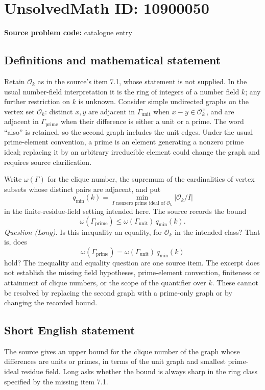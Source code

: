 \documentclass[11pt]{article}
\begin{document}
\section*{UnsolvedMath ID: 10900050}
\textbf{Source problem code:} catalogue entry
\subsection{Definitions and mathematical statement}
Retain \(\mathcal O_k\) as in the source's item 7.1, whose statement is not supplied. In the usual number-field interpretation it is the ring of integers of a number field \(k\); any further restriction on \(k\) is unknown. Consider simple undirected graphs on the vertex set \(\mathcal O_k\): distinct \(x,y\) are adjacent in \(\Gamma_{\mathrm{unit}}\) when \(x-y\in\mathcal O_k^\times\), and are adjacent in \(\Gamma_{\mathrm{prime}}\) when their difference is either a unit or a prime. The word ``also'' is retained, so the second graph includes the unit edges. Under the usual prime-element convention, a prime is an element generating a nonzero prime ideal; replacing it by an arbitrary irreducible element could change the graph and requires source clarification.

Write \(\omega(\Gamma)\) for the clique number, the supremum of the cardinalities of vertex subsets whose distinct pairs are adjacent, and put
\[
 q_{\min}(k)=\min_{I\text{ nonzero prime ideal of }\mathcal O_k}|\mathcal O_k/I|
\]
in the finite-residue-field setting intended here. The source records the bound
\[
 \omega(\Gamma_{\mathrm{prime}})
 \leq \omega(\Gamma_{\mathrm{unit}})\,q_{\min}(k).
\]
\emph{Question (Long).} Is this inequality an equality, for \(\mathcal O_k\) in the intended class? That is, does
\[
 \omega(\Gamma_{\mathrm{prime}})
 =\omega(\Gamma_{\mathrm{unit}})\,q_{\min}(k)
\]
hold? The inequality and equality question are one source item. The excerpt does not establish the missing field hypotheses, prime-element convention, finiteness or attainment of clique numbers, or the scope of the quantifier over \(k\). These cannot be resolved by replacing the second graph with a prime-only graph or by changing the recorded bound.
\subsection{Short English statement}
The source gives an upper bound for the clique number of the graph whose differences are units or primes, in terms of the unit graph and smallest prime-ideal residue field. Long asks whether the bound is always sharp in the ring class specified by the missing item 7.1.
\end{document}
